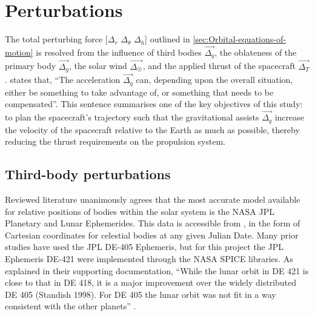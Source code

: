 \section{Perturbations} \label{sec:Perturbations}

The total perturbing force [$\Delta_r$ $\Delta_\theta$ $\Delta_h$] outlined in \autoref{sec:Orbital-equations-of-motion} is resolved from the influence of third bodies $\vec{\Delta_q}$, the oblateness of the primary body $\vec{\Delta_g}$, the solar wind $\vec{\Delta_\Sun}$, and the applied thrust of the spacecraft $\vec{\Delta_T}$. \textcite{Erb_thesis} states that, \enquote{The acceleration $\vec{\Delta_q}$ can, depending upon the overall situation, either be something to take advantage of, or something that needs to be compensated}. This sentence summarises one of the key objectives of this study: to plan the spacecraft's trajectory such that the gravitational assists $\vec{\Delta_q}$ increase the velocity of the spacecraft relative to the Earth as much as possible, thereby reducing the thrust requirements on the propulsion system.



\subsection{Third-body perturbations} \label{sub:Ephemerides}

Reviewed literature unanimously agrees that the most accurate model available for relative positions of bodies within the solar system is the NASA JPL Planetary and Lunar Ephemerides. This data is accessible from \textcite{web_JetPropulsionLaboratory2004}, in the form of Cartesian coordinates for celestial bodies at any given Julian Date. Many prior studies have used the JPL DE-405 Ephemeris, but for this project the JPL Ephemeris DE-421 were implemented through the NASA SPICE libraries. As explained in their supporting documentation, \enquote{While the lunar orbit in DE 421 is close to that in DE 418, it is a major improvement over the widely distributed DE 405 (Standish 1998). For DE 405 the lunar orbit was not fit in a way consistent with the other planets} \parencite{DE421}.

